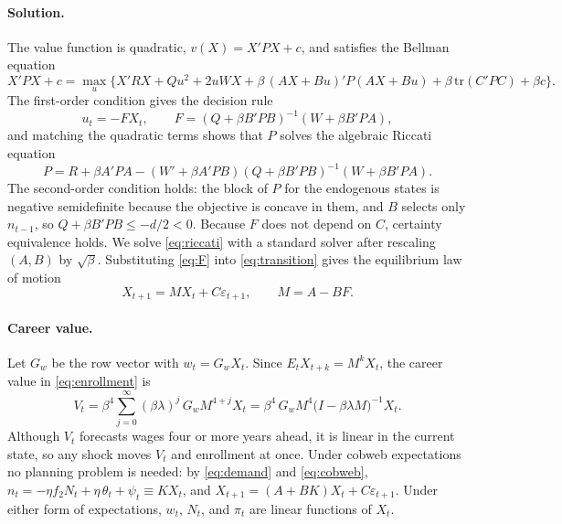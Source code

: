 \documentclass[12pt]{article}
\begin{document}
\paragraph{Solution.} The value function is quadratic, $v(X) = X'PX + c$, and satisfies the Bellman equation
\begin{equation}\label{eq:bellman}
  X'PX + c = \max_{u} \big\{ X'RX + Qu^{2} + 2uWX + \beta\,(AX+Bu)'P(AX+Bu) + \beta\,\mathrm{tr}(C'PC) + \beta c \big\} .
\end{equation}
The first-order condition gives the decision rule
\begin{equation}\label{eq:F}
  u_t = -F X_t, \qquad F = (Q + \beta B'PB)^{-1}(W + \beta B'PA) ,
\end{equation}
and matching the quadratic terms shows that $P$ solves the algebraic Riccati equation
\begin{equation}\label{eq:riccati}
  P = R + \beta A'PA - (W' + \beta A'PB)(Q + \beta B'PB)^{-1}(W + \beta B'PA) .
\end{equation}
The second-order condition holds: the block of $P$ for the endogenous states is negative semidefinite because the objective is concave in them, and $B$ selects only $n_{t-1}$, so $Q + \beta B'PB \le -d/2 < 0$. Because $F$ does not depend on $C$, certainty equivalence holds. We solve \eqref{eq:riccati} with a standard solver after rescaling $(A, B)$ by $\sqrt{\beta}$. Substituting \eqref{eq:F} into \eqref{eq:transition} gives the equilibrium law of motion
\begin{equation}\label{eq:lawofmotion}
  X_{t+1} = M X_t + C \varepsilon_{t+1}, \qquad M = A - BF .
\end{equation}

\paragraph{Career value.} Let $G_w$ be the row vector with $w_t = G_w X_t$. Since $E_t X_{t+k} = M^{k} X_t$, the career value in \eqref{eq:enrollment} is
\begin{equation}\label{eq:Vclosed}
  V_t = \beta^{4} \sum_{j=0}^{\infty} (\beta\lambda)^{j}\, G_w M^{4+j} X_t
      = \beta^{4}\, G_w M^{4} \big(I - \beta\lambda M\big)^{-1} X_t .
\end{equation}
Although $V_t$ forecasts wages four or more years ahead, it is linear in the current state, so any shock moves $V_t$ and enrollment at once. Under cobweb expectations no planning problem is needed: by \eqref{eq:demand} and \eqref{eq:cobweb}, $n_t = -\eta f_2 N_t + \eta\,\theta_t + \psi_t \equiv K X_t$, and $X_{t+1} = (A+BK) X_t + C\varepsilon_{t+1}$. Under either form of expectations, $w_t$, $N_t$, and $\pi_t$ are linear functions of $X_t$.
\end{document}
